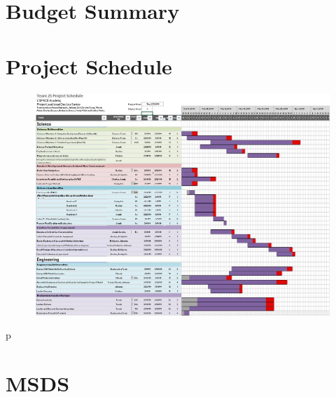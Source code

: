 \documentclass[%
 portrait,
 aapm,
 mph,%
 amsmath,amssymb,
 reprint,%
]{revtex4-2}
\begin{document}
\nocite{*}


\appendix

\clearpage
\section{Budget Summary}


\clearpage

\section{Project Schedule}
\begin{figure}[h!]
  \includegraphics[scale=.85, angle=90]{Appendices/FinishedChart.jpg}
\end{figure} 

\clearpage
p
\section{MSDS}



\clearpage

\clearpage

\clearpage

\clearpage

\clearpage

\clearpage

\clearpage

\clearpage

\clearpage

\clearpage

\clearpage

\end{document}
